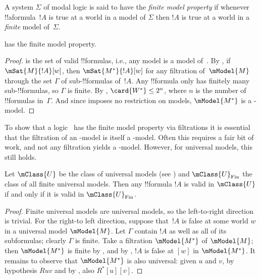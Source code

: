 \documentclass[../../../include/open-logic-section]{subfiles}
\begin{document}


\begin{defn}
  A system $\Sigma$ of modal logic is said to have the \emph{finite
    model property} if whenever !!a{formula}~$!A$ is true at a world
  in a model of $\Sigma$ then $!A$ is true at a world in a
  \emph{finite} model of~$\Sigma$.
\end{defn}

\begin{prop}
   has the finite model property.
\end{prop}

\begin{proof}
   is the set of valid !!{formula}s, i.e., any model is a model
  of~.  By , if
  $\mSat{M}{!A}[w]$, then $\mSat{M^*}{!A}[w]$ for any filtration
  of~$\mModel{M}$ through the set $\Gamma$ of sub-!!{formula}s
  of~$!A$. Any !!{formula} only has finitely many sub-!!{formula}s, so
  $\Gamma$ is finite. By ,
  $\card{W^*} \le 2^n$, where $n$ is the number of !!{formula}s
  in~$\Gamma$. And since  imposes no restriction on models,
  $\mModel{M^*}$ is a -model.
\end{proof}

To show that a logic~ has the finite model property via
filtrations it is essential that the filtration of an -model is
itself a -model. Often this requires a fair bit of work, and
not any filtration yields a -model. However, for universal
models, this still holds.

\begin{prop}
  Let $\mClass{U}$ be the class of universal models (see
  ) and $\mClass{U}_\mathrm{Fin}$ the
  class of all finite universal models. Then any !!{formula} $!A$ is
  valid in $\mClass{U}$ if and only if it is valid in
  $\mClass{U}_\mathrm{Fin}$.
\end{prop}

\begin{proof}
  Finite universal models are universal models, so the left-to-right
  direction is trivial. For the right-to left direction, suppose
  that~$!A$ is false at some world $w$ in a universal model
  $\mModel{M}$. Let $\Gamma$ contain $!A$ as well as all of its
  subformulas; clearly $\Gamma$ is finite. Take a filtration
  $\mModel{M^*}$ of $\mModel{M}$; then $\mModel{M^*}$ is finite by
  , and by
  , $!A$ is false at $[w]$ in
  $\mModel{M^*}$. It remains to observe that $\mModel{M^*}$ is also
  universal: given $u$ and $v$, by hypothesis $Ruv$ and by
  ,
  also $R^*[u][v]$.
\end{proof}
\end{document}
